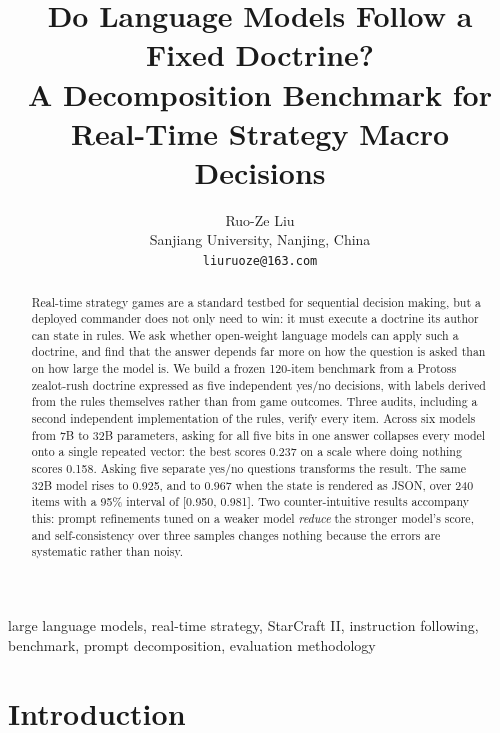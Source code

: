 \documentclass[journal]{IEEEtran}
\begin{document}
\title{Do Language Models Follow a Fixed Doctrine?\\A Decomposition Benchmark for Real-Time Strategy Macro Decisions}

\author{{\large Ruo-Ze Liu}\\[0.6ex]
Sanjiang University, Nanjing, China\\[0.3ex]
\texttt{liuruoze@163.com}}


\maketitle

\begin{abstract}
Real-time strategy games are a standard testbed for sequential decision making, but a deployed
commander does not only need to win: it must execute a doctrine its author can state in rules.
We ask whether open-weight language models can apply such a doctrine, and find that the answer
depends far more on how the question is asked than on how large the model is. We build a frozen
120-item benchmark from a Protoss zealot-rush doctrine expressed as five independent yes/no
decisions, with labels derived from the rules themselves rather than from game outcomes. Three
audits, including a second independent implementation of the rules, verify every item. Across
six models from 7B to 32B parameters, asking for all five bits in one answer collapses every
model onto a single repeated vector: the best scores 0.237 on a scale where doing nothing scores
0.158. Asking five separate yes/no questions transforms the result. The same 32B model rises to
0.925, and to 0.967 when the state is rendered as JSON, over 240 items with a 95\% interval of
[0.950, 0.981]. Two counter-intuitive results accompany this: prompt refinements tuned on a
weaker model \emph{reduce} the stronger model's score, and self-consistency over three samples
changes nothing because the errors are systematic rather than noisy.
\end{abstract}

\begin{IEEEkeywords}
large language models, real-time strategy, StarCraft II, instruction following, benchmark,
prompt decomposition, evaluation methodology
\end{IEEEkeywords}

\section{Introduction}
\end{document}
